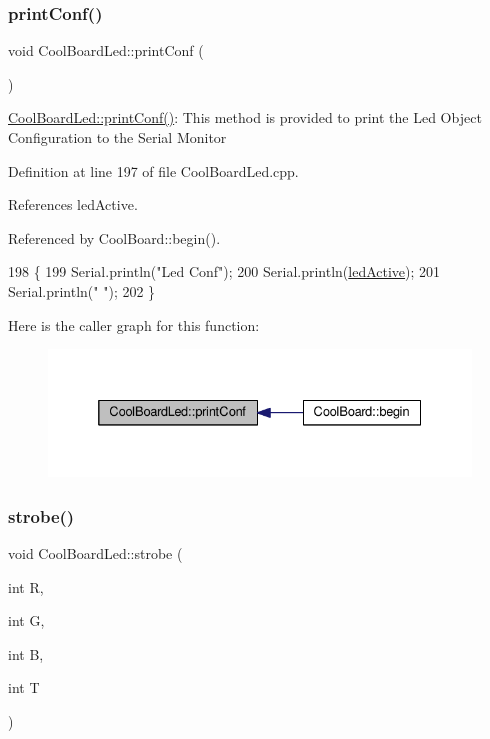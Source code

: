 \subsubsection{\texorpdfstring{print\+Conf()}{printConf()}}
{\footnotesize\ttfamily void Cool\+Board\+Led\+::print\+Conf (\begin{DoxyParamCaption}{ }\end{DoxyParamCaption})}

\hyperlink{classCoolBoardLed_a8ed3053a36f0ed4a131f43b5b17efb61}{Cool\+Board\+Led\+::print\+Conf()}\+: This method is provided to print the Led Object Configuration to the Serial Monitor 

Definition at line 197 of file Cool\+Board\+Led.\+cpp.



References led\+Active.



Referenced by Cool\+Board\+::begin().


\begin{DoxyCode}
198 \{
199     Serial.println(\textcolor{stringliteral}{"Led Conf"});
200     Serial.println(\hyperlink{classCoolBoardLed_a5f17c135516fcf4b44ea8a096ba0177a}{ledActive});
201     Serial.println(\textcolor{stringliteral}{" "});    
202 \}
\end{DoxyCode}
Here is the caller graph for this function\+:\nopagebreak
\begin{figure}[H]
\begin{center}
\leavevmode
\includegraphics[width=332pt]{classCoolBoardLed_a8ed3053a36f0ed4a131f43b5b17efb61_icgraph}
\end{center}
\end{figure}
\mbox{\label{classCoolBoardLed_adc08c0ac07473499971c503d300f0413}} 
\subsubsection{\texorpdfstring{strobe()}{strobe()}}
{\footnotesize\ttfamily void Cool\+Board\+Led\+::strobe (\begin{DoxyParamCaption}\item[{int}]{R,  }\item[{int}]{G,  }\item[{int}]{B,  }\item[{int}]{T }\end{DoxyParamCaption})}

